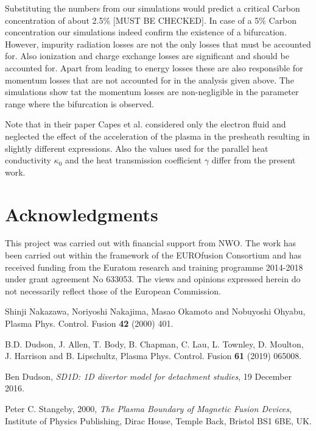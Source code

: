 \documentclass[amsmath,amssymb,a4]{revtex4-2}
\begin{document}
{\begin{equation}
\end{equation}
Substituting the numbers from our simulations would predict a critical Carbon concentration of about 2.5\% [MUST BE CHECKED]. In case of a 5\% Carbon concentration our simulations indeed confirm the existence of a bifurcation. However, impurity radiation losses are not the only losses that must be accounted for. Also ionization and charge exchange losses are significant and should be accounted for. Apart from leading to energy losses these are also responsible for momentum losses that are not accounted for in the analysis given above. The simulations show tat the momentum losses are non-negligible in the parameter range where the bifurcation is observed.

Note that in their paper Capes et al. considered only the electron fluid and neglected the effect of the acceleration of the plasma in the presheath resulting in slightly different expressions. Also the values used for the parallel heat conductivity $\kappa_0$ and the heat transmission coefficient $\gamma$ differ from the present work.

\section*{Acknowledgments}
\noindent This project was carried out with financial support from NWO. The work has been carried out within the framework of the EUROfusion Consortium and has received funding from the Euratom research and training programme 2014-2018 under grant agreement No 633053. The views and opinions expressed herein do not necessarily reflect those of the European Commission.

\begin{thebibliography}{99}
Shinji Nakazawa, Noriyoshi Nakajima, Masao Okamoto and Nobuyoshi Ohyabu, Plasma Phys. Control. Fusion {\bf 42} (2000) 401.

B.D. Dudson, J. Allen, T. Body, B. Chapman, C. Lau, L. Townley, D. Moulton, J. Harrison and B. Lipschultz, Plasma Phys. Control. Fusion {\bf 61} (2019) 065008.

Ben Dudson, {\it SD1D: 1D divertor model for detachment studies}, 19 December 2016.

Peter C. Stangeby, 2000, {\it The Plasma Boundary of Magnetic Fusion Devices}, Institute of Physics Publishing, Dirac House, Temple Back, Bristol BS1 6BE,
UK.


\end{thebibliography}}
\end{document}
